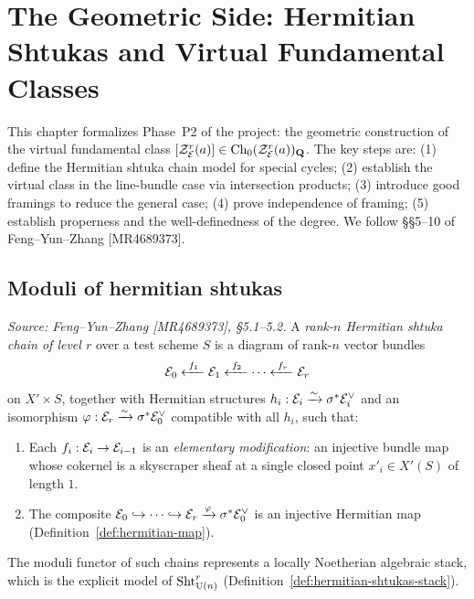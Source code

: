 \chapter{The Geometric Side: Hermitian Shtukas and Virtual Fundamental Classes}
\label{chap:geometric-side}

This chapter formalizes Phase~P2 of the project: the geometric construction of the virtual
fundamental class \([\mathcal{Z}_{\mathcal{E}}^r(a)] \in \operatorname{Ch}_0(\mathcal{Z}_{\mathcal{E}}^r(a))_{\mathbf{Q}}\). The key
steps are: (1) define the Hermitian shtuka chain model for special cycles; (2) establish
the virtual class in the line-bundle case via intersection products; (3) introduce good framings
to reduce the general case; (4) prove independence of framing; (5) establish properness and
the well-definedness of the degree. We follow \S\S5--10 of Feng--Yun--Zhang [MR4689373].

\section{Moduli of hermitian shtukas}

\begin{definition}
  \label{def:herm-shtuka-chain}
  \textit{Source: Feng--Yun--Zhang [MR4689373], \S5.1--5.2.}
  A \emph{rank-\(n\) Hermitian shtuka chain of level \(r\)} over a test scheme \(S\) is
  a diagram of rank-\(n\) vector bundles
  \[
    \mathcal{E}_0 \xleftarrow{\;f_1\;} \mathcal{E}_1 \xleftarrow{\;f_2\;} \cdots \xleftarrow{\;f_r\;}
    \mathcal{E}_r
  \]
  on \(X' \times S\), together with Hermitian structures
  \(h_i : \mathcal{E}_i \xrightarrow{\sim} \sigma^*\mathcal{E}_i^\vee\) and an isomorphism
  \(\varphi : \mathcal{E}_r \xrightarrow{\sim} \sigma^*\mathcal{E}_0^\vee\) compatible with all \(h_i\),
  such that:
  \begin{enumerate}
    \item Each \(f_i : \mathcal{E}_i \to \mathcal{E}_{i-1}\) is an \emph{elementary modification}: an
      injective bundle map whose cokernel is a skyscraper sheaf at a single closed point
      \(x'_i \in X'(S)\) of length \(1\).
    \item The composite
      \(\mathcal{E}_0 \hookrightarrow \cdots \hookrightarrow \mathcal{E}_r \xrightarrow{\varphi}
      \sigma^*\mathcal{E}_0^\vee\)
      is an injective Hermitian map (Definition~\ref{def:hermitian-map}).
  \end{enumerate}
  The moduli functor of such chains represents a locally Noetherian algebraic stack, which
  is the explicit model of \(\operatorname{Sht}_{\operatorname{U}(n)}^r\) (Definition~\ref{def:hermitian-shtukas-stack}).
\end{definition}

